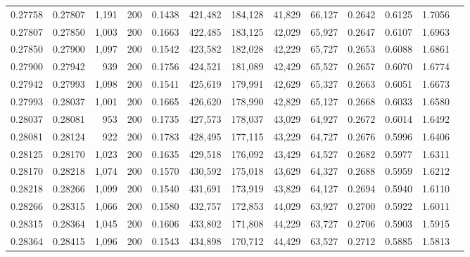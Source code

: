 \begin{tabular}{rrrrrrrrrrrrr}
0.27758 & 0.27807 & 1,191 & 200 &                                     0.1438 & 421,482 & 184,128 &  41,829 &  66,127 & 0.2642 & 0.6125 & 1.7056 \\
0.27807 & 0.27850 & 1,003 & 200 &                                     0.1663 & 422,485 & 183,125 &  42,029 &  65,927 & 0.2647 & 0.6107 & 1.6963 \\
0.27850 & 0.27900 & 1,097 & 200 &                                     0.1542 & 423,582 & 182,028 &  42,229 &  65,727 & 0.2653 & 0.6088 & 1.6861 \\
0.27900 & 0.27942 &   939 & 200 &                                     0.1756 & 424,521 & 181,089 &  42,429 &  65,527 & 0.2657 & 0.6070 & 1.6774 \\
0.27942 & 0.27993 & 1,098 & 200 &                                     0.1541 & 425,619 & 179,991 &  42,629 &  65,327 & 0.2663 & 0.6051 & 1.6673 \\
0.27993 & 0.28037 & 1,001 & 200 &                                     0.1665 & 426,620 & 178,990 &  42,829 &  65,127 & 0.2668 & 0.6033 & 1.6580 \\
0.28037 & 0.28081 &   953 & 200 &                                     0.1735 & 427,573 & 178,037 &  43,029 &  64,927 & 0.2672 & 0.6014 & 1.6492 \\
0.28081 & 0.28124 &   922 & 200 &                                     0.1783 & 428,495 & 177,115 &  43,229 &  64,727 & 0.2676 & 0.5996 & 1.6406 \\
0.28125 & 0.28170 & 1,023 & 200 &                                     0.1635 & 429,518 & 176,092 &  43,429 &  64,527 & 0.2682 & 0.5977 & 1.6311 \\
0.28170 & 0.28218 & 1,074 & 200 &                                     0.1570 & 430,592 & 175,018 &  43,629 &  64,327 & 0.2688 & 0.5959 & 1.6212 \\
0.28218 & 0.28266 & 1,099 & 200 &                                     0.1540 & 431,691 & 173,919 &  43,829 &  64,127 & 0.2694 & 0.5940 & 1.6110 \\
0.28266 & 0.28315 & 1,066 & 200 &                                     0.1580 & 432,757 & 172,853 &  44,029 &  63,927 & 0.2700 & 0.5922 & 1.6011 \\
0.28315 & 0.28364 & 1,045 & 200 &                                     0.1606 & 433,802 & 171,808 &  44,229 &  63,727 & 0.2706 & 0.5903 & 1.5915 \\
0.28364 & 0.28415 & 1,096 & 200 &                                     0.1543 & 434,898 & 170,712 &  44,429 &  63,527 & 0.2712 & 0.5885 & 1.5813 \\

\end{tabular}
